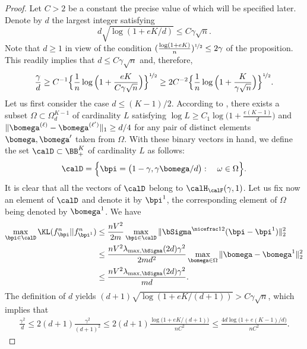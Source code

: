 \begin{proof}
Let $C>2$ be a constant the precise value of which will be specified later.
Denote by  $d$ the largest integer satisfying
\begin{equation}\label{eqFvSxFv}
	d\sqrt{\log(1+eK/d)} \leq C{\gamma\sqrt{n}}.
\end{equation}
Note that $d\ge 1$ in view of the condition $(\frac{\log(1+eK)}{n})^{\nicefrac12}\le 2\gamma$ of the 
proposition. This readily implies that $d\leq C\gamma\sqrt{n}$ and, therefore, 
\begin{equation}\label{eqFvSxSx}
\frac{\gamma}{d} 
    \ge C^{-1}\Big\{{\frac1n\log\Big(1+\frac{eK}{C\gamma\sqrt{n}}\Big)}\Big\}^{\nicefrac12}
    \ge 2C^{-2}\Big\{{\frac1n\log\Big(1+\frac{K}{\gamma\sqrt{n}}\Big)}\Big\}^{\nicefrac12}.
\end{equation}
Let us first consider the case $d \leq (K-1)/2$. According to , there 
exists a subset $\Omega \subset \Omega_{d}^{K-1}$ of cardinality $L$ satisfying 
$\log L\geq C_1\log\big(1+\frac{e(K-1)}{d}\big)$ and $\|\bomega^{(\ell)}-\bomega^{(\ell')}\|_1\geq d/4$
for any pair of distinct elements $\bomega,\bomega'$ taken from $\Omega$. With these 
binary vectors in hand, we define the set $\calD \subset \BB_+^K$ of cardinality $L$ as follows:
\begin{equation}
\calD = \Big\{\bpi = \big(1-\gamma,{\gamma}\bomega/{d}\big) : \quad\omega \in \Omega\Big\}.
\end{equation}
It is clear that all the vectors of $\calD$ belong to $\calH_\calF(\gamma,1)$. 
Let us fix now an element of $\calD$ and denote it by $\bpi^1$, the corresponding element of
$\Omega$ being denoted by $\bomega^1$. We have
\begin{align}
 \max_{\bpi\in\calD}\KL(f^n_{\bpi}||f^n_{\bpi^1})
        &\leq \frac{nV^2}{2m}\max_{\bpi\in\calD} \|\bSigma^{\nicefrac12}(\bpi-\bpi^{1})\|_2^2 \\
        &\leq \frac{nV^2\lambda_{\max,\bSigma}(2d)\gamma^2}{2m d^2} \max_{\bomega\in\Omega}
                \|\bomega-\bomega^{1}\|_2^2\\
        &\leq \frac{nV^2\lambda_{\max,\bSigma}(2d)\gamma^2}{m d}. \label{eqKLlowerBoundInq}
\end{align}
The definition of $d$ yields $(d+1)\sqrt{\log(1+eK/(d+1))}> C\gamma\sqrt{n}$, which implies that
\begin{align}
\frac{\gamma^2}{d}
        \leq 2(d+1)\frac{\gamma^2}{(d+1)^2}
        \leq 2(d+1)\frac{\log\big(1+eK/(d+1)\big)}{nC^2}
        \leq \frac{4d\log\big(1+e(K-1)/d\big)}{nC^2}.

\end{align}
\end{proof}
